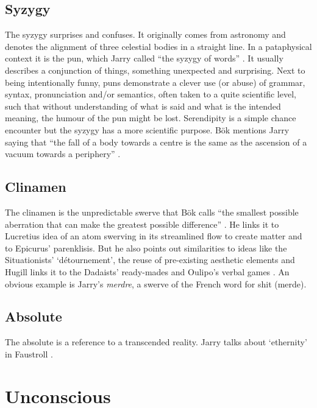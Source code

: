 

\subsection{Syzygy}
\label{s:syzygy}

The syzygy surprises and confuses. It originally comes from astronomy and denotes the alignment of three celestial bodies in a straight line. In a pataphysical context it is the pun, which Jarry called ``the syzygy of words'' \autocite*{Jarry1996}. It usually describes a conjunction of things, something unexpected and surprising. Next to being intentionally funny, puns demonstrate a clever use (or abuse) of grammar, syntax, pronunciation and/or semantics, often taken to a quite scientific level, such that without understanding of what is said and what is the intended meaning, the humour of the pun might be lost. Serendipity is a simple chance encounter but the syzygy has a more scientific purpose. Bök mentions Jarry saying that ``the fall of a body towards a centre is the same as the ascension of a vacuum towards a periphery'' \citeyear[p.42]{Bok2002}.


\subsection{Clinamen}
\label{s:clinamen}

The clinamen is the unpredictable swerve that Bök calls ``the smallest possible aberration that can make the greatest possible difference'' \citeyear[p.43]{Bok2002}. He links it to Lucretius idea of an atom swerving in its streamlined flow to create matter and to Epicurus' parenklisis. But he also points out similarities to ideas like the Situationists' `détournement', the reuse of pre-existing aesthetic elements and Hugill links it to the Dadaists' ready-mades and Oulipo's verbal games \autocite*{Hugill2012}. An obvious example is Jarry's \emph{merdre}, a swerve of the French word for shit (merde).


\subsection{Absolute}
\label{s:absolute}

The absolute is a reference to a transcended reality. Jarry talks about `ethernity' in Faustroll \citeyear[p.104]{Jarry1996}.


\section{Unconscious}

